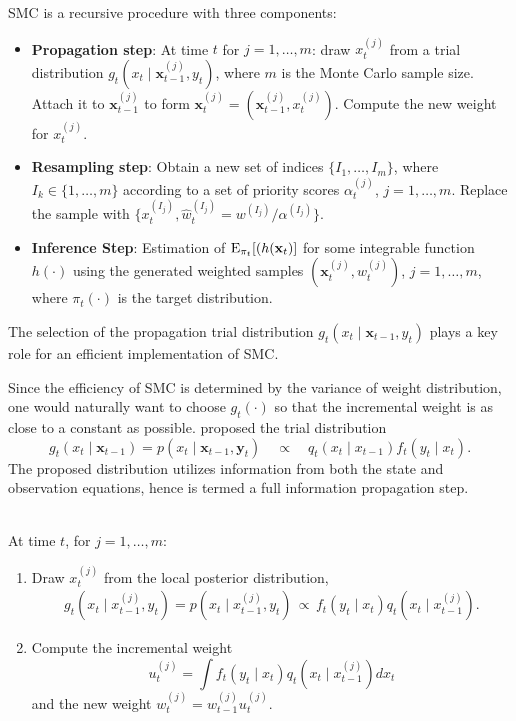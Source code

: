 SMC is a recursive procedure with three components:
\begin{itemize}
\item {\bf Propagation step}: At time $t$ for $j=1,\ldots, m$: draw $x_t^{(j)}$ from a trial distribution $g_t(x_t \mid {\mathbf x}_{t-1}^{(j)},y_t)$, where $m$ is the Monte Carlo sample size. Attach it to ${\mathbf x}_{t-1}^{(j)}$ to form ${\mathbf x}_{t}^{(j)}=({\mathbf x}_{t-1}^{(j)}, x_t^{(j)})$. Compute the new weight for $x_{t}^{(j)}$.
\item {\bf Resampling step}: Obtain a new set of indices $\{I_1, \ldots, I_m\}$, where $I_k\in \{1, \ldots, m \}$ according to a set of priority scores $\alpha_t^{(j)}$, $j=1,\ldots, m$. Replace the sample with $\{x_t^{(I_j)}, \hat{w}_t^{(I_j)}=w^{(I_j)}/\alpha^{(I_j)}\}$.
\item {\bf Inference Step}: Estimation of ${\rm E}_{\pi_t}[(h({\mathbf x}_t)]$ for some integrable function $h(\cdot)$ using the generated weighted samples $({\mathbf x}_t^{(j)}, w_t^{(j)})$, $j=1,\ldots,m$, where $\pi_t(\cdot)$ is the target distribution. 
\end{itemize}
The selection of the propagation trial distribution $g_t(x_t\mid {\mathbf x}_{t-1},y_t)$ plays a key role
for an efficient implementation of SMC.

Since the efficiency of SMC is determined by the variance of weight distribution, one would naturally want to choose $g_t(\cdot)$ so that the incremental weight is as close to a constant as possible. \cite{LiuChen1995, LiuChen1998} proposed the trial distribution
\[
g_t(x_t\mid {\mathbf x}_{t-1})=p(x_t\mid {\mathbf x}_{t-1},{\mathbf y}_t)\quad  \propto\quad  q_t(x_t\mid x_{t-1})f_t(y_t\mid x_t).
\]
The proposed distribution utilizes information from both the state and observation equations, hence is termed a full information propagation step.

\\
At time $t$, for $j=1,\ldots,m$:
\begin{enumerate}
\item Draw $x_t^{(j)}$ from the local posterior distribution,
\begin{align*}
g_t(x_t\mid x_{t-1}^{(j)}, y_t)=p(x_t \mid x_{t-1}^{(j)},y_t)\, \propto\,  f_t(y_t\mid x_t)q_t(x_t \mid x_{t-1}^{(j)}).
\end{align*}
\item Compute the incremental weight
\[
u_t^{(j)}=\int f_t(y_t \mid x_t) q_t(x_t \mid x_{t-1}^{(j)})dx_t
\]
and the new weight $w_t^{(j)}=w_{t-1}^{(j)}u_t^{(j)}$.
\end{enumerate}

